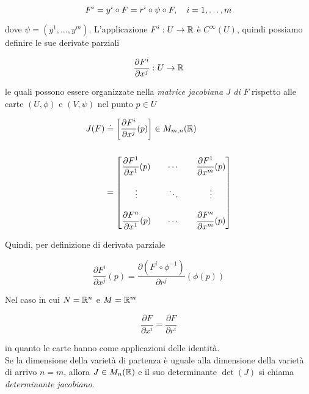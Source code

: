\begin{equation}
	F^{i} = y^{i} \circ F = r^{i} \circ \psi \circ F \qcomma i=1,\dots,m
\end{equation}

dove $ \psi = (y^{1},\dots,y^{m}) $. L'applicazione $ F^{i} : U \to \mathbb{R} $ è $ C^{\infty}(U) $, quindi possiamo definire le sue derivate parziali

\begin{equation}
	\dfrac{\partial F^{i}}{\partial x^{j}} : U \to \mathbb{R}
\end{equation}

le quali possono essere organizzate nella \textit{matrice jacobiana} $ J $ \textit{di} $ F $ rispetto alle carte $ (U,\phi) $ e $ (V,\psi) $ nel punto $ p \in U $

\begin{align}
	\begin{split}
		J(F) &\doteq \left[ \dfrac{\partial F^{i}}{\partial x^{j}} (p) \right] \in M_{m,n}(\mathbb{R})\\\\
		&= \begin{bmatrix} \dfrac{\partial F^{1}}{\partial x^{1}} (p) & & \cdots & & \dfrac{\partial F^{1}}{\partial x^{m}} (p) \\\\ \vdots & & \ddots & & \vdots \\\\ \dfrac{\partial F^{n}}{\partial x^{1}} (p) & & \cdots & & \dfrac{\partial F^{n}}{\partial x^{m}} (p) \end{bmatrix}
	\end{split}
\end{align}

Quindi, per definizione di derivata parziale

\begin{equation}
	\dfrac{\partial F^{i}}{\partial x^{j}} (p) = \dfrac{\partial (F^{i} \circ \phi^{-1})}{\partial r^{j}} (\phi(p))
\end{equation}

Nel caso in cui $ N = \mathbb{R}^{n} $ e $ M = \mathbb{R}^{m} $

\begin{equation}
	\dfrac{\partial F}{\partial x^{i}} = \dfrac{\partial F}{\partial r^{i}}
\end{equation}

in quanto le carte hanno come applicazioni delle identità.\\
Se la dimensione della varietà di partenza è uguale alla dimensione della varietà di arrivo $ n=m $, allora $ J \in M_{n}(\mathbb{R}) $ e il suo determinante $ \det(J) $ si chiama \textit{determinante jacobiano}.

